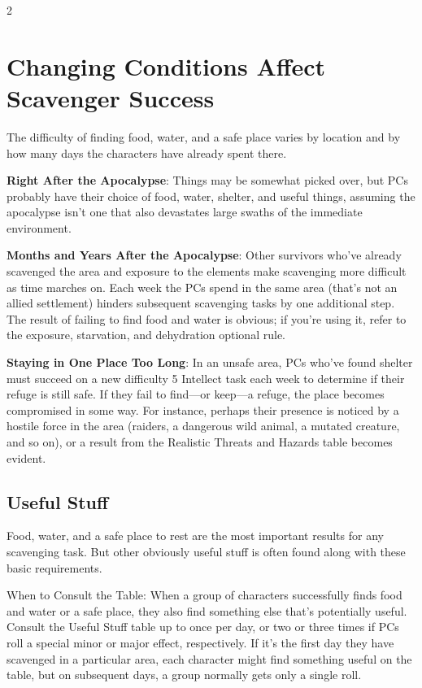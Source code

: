 \begin{multicols}{2}

\section{Changing Conditions Affect Scavenger Success}

The difficulty of finding food, water, and a safe place varies by location and by how many days the characters have already spent there. 

\textbf{Right After the Apocalypse}: Things may be somewhat picked over, but PCs probably have their choice of food, water, shelter, and useful things, assuming the apocalypse isn’t one that also devastates large swaths of the immediate environment. 

\textbf{Months and Years After the Apocalypse}: Other survivors who’ve already scavenged the area and exposure to the elements make scavenging more difficult as time marches on. Each week the PCs spend in the same area (that’s not an allied settlement) hinders subsequent scavenging tasks by one additional step. The result of failing to find food and water is obvious; if you’re using it, refer to the exposure, starvation, and dehydration optional rule. 

\textbf{Staying in One Place Too Long}: In an unsafe area, PCs who’ve found shelter must succeed on a new difficulty 5 Intellect task each week to determine if their refuge is still safe. If they fail to find—or keep—a refuge, the place becomes compromised in some way. For instance, perhaps their presence is noticed by a hostile force in the area (raiders, a dangerous wild animal, a mutated creature, and so on), or a result from the Realistic Threats and Hazards table becomes evident.

\subsection{Useful Stuff}

Food, water, and a safe place to rest are the most important results for any scavenging task. But other obviously useful stuff is often found along with these basic requirements. 

When to Consult the Table: When a group of characters successfully finds food and water or a safe place, they also find something else that’s potentially useful. Consult the Useful Stuff table up to once per day, or two or three times if PCs roll a special minor or major effect, respectively. If it’s the first day they have scavenged in a particular area, each character might find something useful on the table, but on subsequent days, a group normally gets only a single roll. 


\end{multicols}
